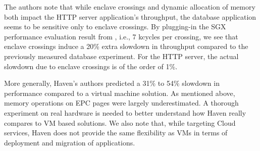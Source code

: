 The authors note that while enclave crossings and dynamic allocation of memory both impact the HTTP server application's throughput, the database application seems to be sensitive only to enclave crossings.
By plugging-in the SGX performance evaluation result from \cite{DBLP:conf/IEEEwisa/ZhaoSTZX16}, i.e., 7 kcycles per crossing, we see that enclave crossings induce a 20\% extra slowdown in throughput compared to the previously measured database experiment.
For the HTTP server, the actual slowdown due to enclave crossings is of the order of 1\%.

More generally, Haven's authors predicted a 31\% to 54\% slowdown in performance compared to a virtual machine solution.
As mentioned above, memory operations on EPC pages were largely underestimated.
A thorough experiment on real hardware is needed to better understand how Haven really compares to VM based solutions.
We also note that, while targeting Cloud services, Haven does not provide the same flexibility as VMs in terms of deployment and migration of applications.
